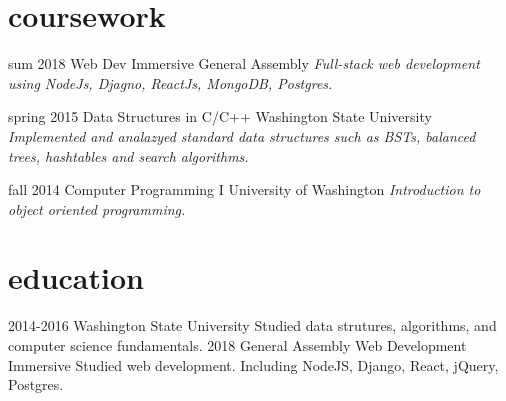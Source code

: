 \documentclass[]{friggeri-cv}
\begin{document}
\section{coursework}

\begin{entrylist}


  \entry
    {sum 2018}
    {Web Dev Immersive}
    {General Assembly}
    {\emph{Full-stack web development using NodeJs, Djagno, ReactJs, MongoDB, Postgres. }}

  \entry
    {spring 2015}
    {Data Structures in C/C++}
    {Washington State University}
    {\emph{Implemented and analazyed standard data structures such as BSTs, balanced trees, hashtables and search algorithms.}}

  \entry
    {fall 2014}
    {Computer Programming I}
    {University of Washington}
    {\emph{Introduction to object oriented programming.}}

\end{entrylist}



\section{education}

\begin{entrylist}
  \entry
    {2014-2016}
    {Washington State University}
    {}
    {Studied data strutures, algorithms, and computer science fundamentals.}
  \entry
    {2018}
    {General Assembly}
    {Web Development Immersive}
    {Studied web development. Including NodeJS, Django, React, jQuery, Postgres.}

\end{entrylist}
\end{document}

